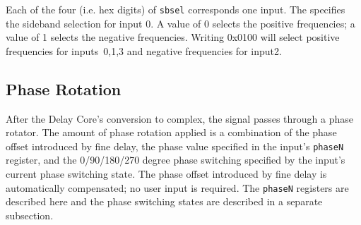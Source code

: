 \documentclass[12pt]{article}
\begin{document}
\begin{description}
Each of the four \LSns (i.e. hex digits) of \verb|sbsel| corresponds
one input.  The \LSn specifies the sideband selection for input 0.  A value of
0 selects the positive frequencies; a value of 1 selects the negative
frequencies.  Writing 0x0100 will select positive frequencies for inputs~0,1,3
and negative frequencies for input2.

\end{description}

  \subsection{Phase Rotation}

After the Delay Core's conversion to complex, the signal passes through a phase
rotator.  The amount of phase rotation applied is a combination of the phase
offset introduced by fine delay, the phase value specified in the input's
\verb|phaseN| register, and the 0/90/180/270 degree phase switching specified
by the input's current phase switching state.  The phase offset introduced by
fine delay is automatically compensated; no user input is required.  The
\verb|phaseN| registers are described here and the phase switching states are
described in a separate subsection.
\end{document}
